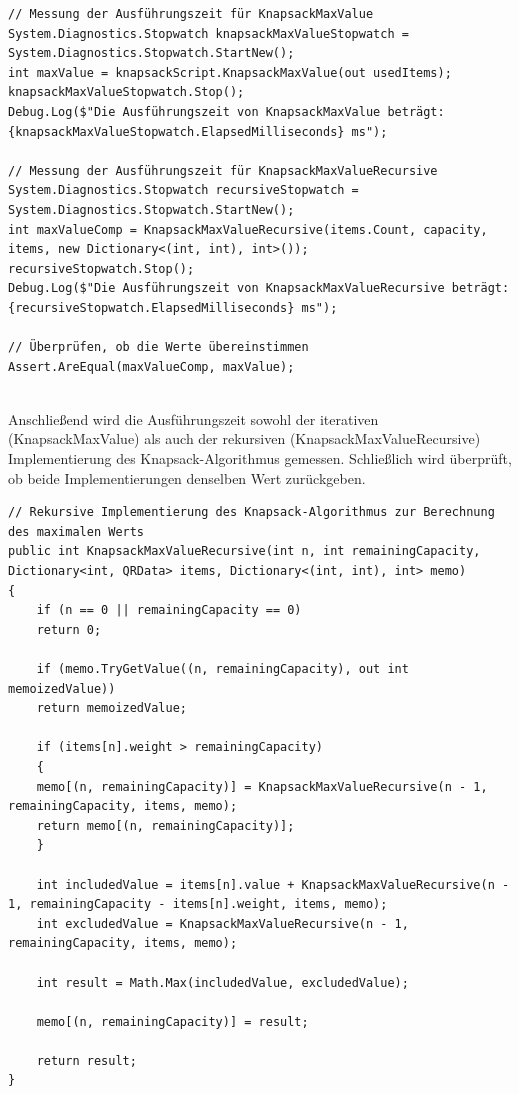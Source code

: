 \begin{lstlisting}[style=csharp, caption={Zeitmessung}, label=code:Zeitmessung]
// Messung der Ausführungszeit für KnapsackMaxValue
System.Diagnostics.Stopwatch knapsackMaxValueStopwatch = System.Diagnostics.Stopwatch.StartNew();
int maxValue = knapsackScript.KnapsackMaxValue(out usedItems);
knapsackMaxValueStopwatch.Stop();
Debug.Log($"Die Ausführungszeit von KnapsackMaxValue beträgt: {knapsackMaxValueStopwatch.ElapsedMilliseconds} ms");

// Messung der Ausführungszeit für KnapsackMaxValueRecursive
System.Diagnostics.Stopwatch recursiveStopwatch = System.Diagnostics.Stopwatch.StartNew();
int maxValueComp = KnapsackMaxValueRecursive(items.Count, capacity, items, new Dictionary<(int, int), int>());
recursiveStopwatch.Stop();
Debug.Log($"Die Ausführungszeit von KnapsackMaxValueRecursive beträgt: {recursiveStopwatch.ElapsedMilliseconds} ms");

// Überprüfen, ob die Werte übereinstimmen
Assert.AreEqual(maxValueComp, maxValue);
\end{lstlisting}\\
Anschließend wird die Ausführungszeit sowohl der iterativen (KnapsackMaxValue) als auch der rekursiven (KnapsackMaxValueRecursive)
Implementierung des Knapsack-Algorithmus gemessen. Schließlich wird überprüft, ob beide Implementierungen denselben Wert zurückgeben.


\begin{lstlisting}[style=csharp, caption={Rekursiver Algorithmus}, label=code:Rekursiver Algorithmus]
// Rekursive Implementierung des Knapsack-Algorithmus zur Berechnung des maximalen Werts
public int KnapsackMaxValueRecursive(int n, int remainingCapacity, Dictionary<int, QRData> items, Dictionary<(int, int), int> memo)
{
    if (n == 0 || remainingCapacity == 0)
    return 0;

    if (memo.TryGetValue((n, remainingCapacity), out int memoizedValue))
    return memoizedValue;

    if (items[n].weight > remainingCapacity)
    {
    memo[(n, remainingCapacity)] = KnapsackMaxValueRecursive(n - 1, remainingCapacity, items, memo);
    return memo[(n, remainingCapacity)];
    }

    int includedValue = items[n].value + KnapsackMaxValueRecursive(n - 1, remainingCapacity - items[n].weight, items, memo);
    int excludedValue = KnapsackMaxValueRecursive(n - 1, remainingCapacity, items, memo);

    int result = Math.Max(includedValue, excludedValue);

    memo[(n, remainingCapacity)] = result;

    return result;
}
\end{lstlisting}\\

